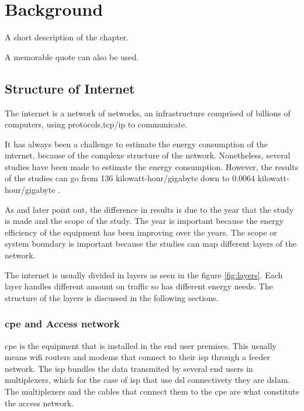 

\chapter{Background}
\label{chapter:background}

\begin{introduction}
A short description of the chapter.

A memorable quote can also be used.
\end{introduction}

\section{Structure of Internet}

The internet is a network of networks, an infrastructure comprised of billions of computers, 
using protocols,\ac{tcp}/\ac{ip} to communicate.

It has always been a challenge to estimate the energy consumption of the internet, because of the complexe structure of the network. Nonetheless, several studies have been made to estimate the energy consumption. However, the results of the studies can go from 136 \ac{kilowatt-hour}/\ac{gigabyte}
\citet{Koomey2003} down to 0.0064 \ac{kilowatt-hour}/\ac{gigabyte} \citet{Baliga2011}.

As \citet{Coroama2015} and later \citet{Aslan2018} point out, the difference in results is due to the year that the study is made and the scope of the study. 
The year is important because the energy efficiency of the equipment has been improving over the years. 
The scope or system boundary is important because the studies can map different layers of the network.

The internet is usually divided in layers as seen in the figure \ref{fig:layers}. 
Each layer handles different amount on traffic so has different energy needs.
The structure of the layers is discussed in the following sections.

\subsection{\acl{cpe} and Access network}

\ac{cpe} is the equipment that is installed in the end user premises. This usually means wifi routers and modems that connect to their \ac{isp} through a feeder network. The \ac{isp} bundles the data transmited by several end users in multiplexers, which for the case of \ac{isp} that use \ac{dsl} connectivety they are \ac{dslam}. The multiplexers and the cables that connect them to the \ac{cpe} are what constitute the access network.

